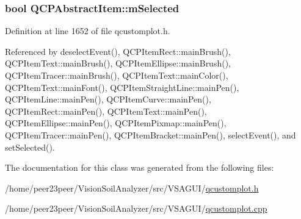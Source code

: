 \hypertarget{class_q_c_p_abstract_item_a4bdb3457dad1d268c0f78a44152b9645}{}
\subsubsection[{m\+Selected}]{\setlength{\rightskip}{0pt plus 5cm}bool Q\+C\+P\+Abstract\+Item\+::m\+Selected\hspace{0.3cm}{\ttfamily [protected]}}\label{class_q_c_p_abstract_item_a4bdb3457dad1d268c0f78a44152b9645}


Definition at line 1652 of file qcustomplot.\+h.



Referenced by deselect\+Event(), Q\+C\+P\+Item\+Rect\+::main\+Brush(), Q\+C\+P\+Item\+Text\+::main\+Brush(), Q\+C\+P\+Item\+Ellipse\+::main\+Brush(), Q\+C\+P\+Item\+Tracer\+::main\+Brush(), Q\+C\+P\+Item\+Text\+::main\+Color(), Q\+C\+P\+Item\+Text\+::main\+Font(), Q\+C\+P\+Item\+Straight\+Line\+::main\+Pen(), Q\+C\+P\+Item\+Line\+::main\+Pen(), Q\+C\+P\+Item\+Curve\+::main\+Pen(), Q\+C\+P\+Item\+Rect\+::main\+Pen(), Q\+C\+P\+Item\+Text\+::main\+Pen(), Q\+C\+P\+Item\+Ellipse\+::main\+Pen(), Q\+C\+P\+Item\+Pixmap\+::main\+Pen(), Q\+C\+P\+Item\+Tracer\+::main\+Pen(), Q\+C\+P\+Item\+Bracket\+::main\+Pen(), select\+Event(), and set\+Selected().



The documentation for this class was generated from the following files\+:\begin{DoxyCompactItemize}
\item 
/home/peer23peer/\+Vision\+Soil\+Analyzer/src/\+V\+S\+A\+G\+U\+I/\hyperlink{qcustomplot_8h}{qcustomplot.\+h}\item 
/home/peer23peer/\+Vision\+Soil\+Analyzer/src/\+V\+S\+A\+G\+U\+I/\hyperlink{qcustomplot_8cpp}{qcustomplot.\+cpp}\end{DoxyCompactItemize}
